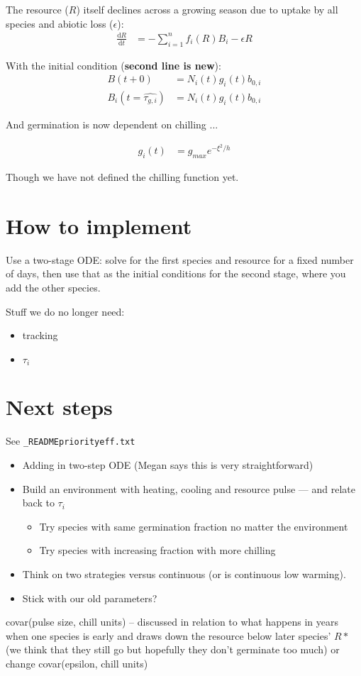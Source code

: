 \documentclass[11pt,letter]{article}
\begin{document}
The resource ($R$) itself declines across a growing season due to uptake by all species and abiotic loss ($\epsilon$):
\begin{align}
\frac{\mathrm{d}R}{\mathrm{d}t} & = - \sum_{i=1}^{n}f_{i}(R)B_{i} -\epsilon R
\end{align}


With the initial condition ({\bf second line is new}):
\begin{align}
B(t+0) & = N_{i}(t)g_{i}(t)b_{0,i}\\
B_i(t=\hat{\tau_{g,i}}) & = N_{i}(t)g_{i}(t)b_{0,i}
\end{align}

And germination is now dependent on chilling ...

\begin{align}
g_i(t) & = g_{max}e^{-\xi^2/h}
\end{align}

Though we have not defined the chilling function yet. 



\section{How to implement} 

Use a two-stage ODE: solve for the first species and resource for a fixed number of days, then use that as the initial conditions for the second stage, where you add the other species.


Stuff we do no longer need:\\
\begin{itemize}
\item tracking
\item $\tau_i$
\end{itemize}

\section{Next steps}

See \verb|_READMEpriorityeff.txt|

\begin{itemize}
\item Adding in two-step ODE (Megan says this is very straightforward)
\item  Build an environment with heating, cooling and resource pulse — and relate back to $\tau_i$
\begin{itemize}
\item Try species with same germination fraction no matter the environment
\item Try species with increasing fraction with more chilling 
\end{itemize}
\item Think on two strategies versus continuous (or is continuous low warming).
\item Stick with our old parameters? 
\end{itemize}

covar(pulse size, chill units) -- discussed in relation to what happens in years when one species is early and draws down the resource below later species' $R*$ (we think that they still go but hopefully they don't germinate too much) or change covar(epsilon, chill units)\\
\end{document}
